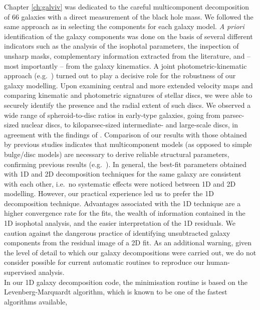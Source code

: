Chapter \ref{ch:galviv} \citep{paperI} was dedicated to the careful multicomponent decomposition of 66 galaxies 
with a direct measurement of the black hole mass. 
We followed the same approach as \citet{laurikainen2005} in selecting the components for each galaxy model.  
\emph{A priori} identification of the galaxy components was done on the basis of several different indicators 
such as the analysis of the isophotal parameters, 
the inspection of unsharp masks, 
complementary information extracted from the literature, 
and -- most importantly -- from the galaxy kinematics. 
A joint photometric-kinematic approach (e.g.~\citealt{krajnovic2013,arnold2014}) 
turned out to play a decisive role for the robustness of our galaxy modelling. 
Upon examining central \citep{atlas3dIII,scott2014} and more extended \citep{arnold2014} velocity maps 
and comparing kinematic and photometric signatures of stellar discs, 
we were able to securely identify the presence and the radial extent of such discs. 
We observed a wide range of spheroid-to-disc ratios in early-type galaxies, 
going from parsec-sized nuclear discs, to kiloparsec-sized intermediate- and large-scale discs, 
in agreement with the findings of \citet{krajnovic2013}. 
Comparison of our results with those obtained by previous studies indicates that 
multicomponent models (as opposed to simple bulge/disc models) are necessary 
to derive reliable structural parameters, confirming previous results 
(e.g.~\citealt{laurikainen2005,laurikainen2007,laurikainen2010,lasker2014data,salo2015}). 
In general, the best-fit parameters obtained with 1D and 2D decomposition techniques for the same galaxy 
are consistent with each other, 
i.e.~no systematic effects were noticed between 1D and 2D modelling. 
However, our practical experience led us to prefer the 1D decomposition technique. 
Advantages associated with the 1D technique are a higher convergence rate for the fits, 
the wealth of information contained in the 1D isophotal analysis, 
and the easier interpretation of the 1D residuals. 
We caution against the dangerous practice of identifying unsubtracted galaxy components 
from the residual image of a 2D fit. 
As an additional warning, 
given the level of detail to which our galaxy decompositions were carried out, 
we do not consider possible for current automatic routines to reproduce our human-supervised analysis. \\
In our 1D galaxy decomposition code, the minimisation routine is based on the Levenberg-Marquardt algorithm, 
which is known to be one of the fastest algorithms available, 
